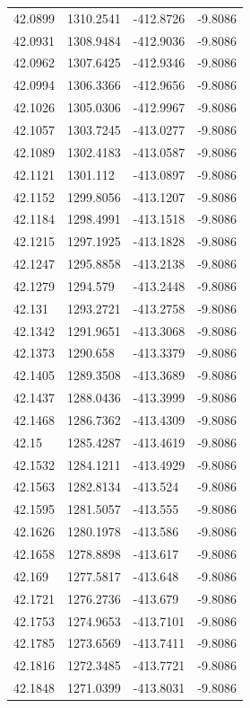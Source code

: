 \begin{table}[H]
\begin{tabular}{llll}
42.0899 & 1310.2541 & -412.8726 & -9.8086 \\
42.0931 & 1308.9484 & -412.9036 & -9.8086 \\
42.0962 & 1307.6425 & -412.9346 & -9.8086 \\
42.0994 & 1306.3366 & -412.9656 & -9.8086 \\
42.1026 & 1305.0306 & -412.9967 & -9.8086 \\
42.1057 & 1303.7245 & -413.0277 & -9.8086 \\
42.1089 & 1302.4183 & -413.0587 & -9.8086 \\
42.1121 & 1301.112 & -413.0897 & -9.8086 \\
42.1152 & 1299.8056 & -413.1207 & -9.8086 \\
42.1184 & 1298.4991 & -413.1518 & -9.8086 \\
42.1215 & 1297.1925 & -413.1828 & -9.8086 \\
42.1247 & 1295.8858 & -413.2138 & -9.8086 \\
42.1279 & 1294.579 & -413.2448 & -9.8086 \\
42.131 & 1293.2721 & -413.2758 & -9.8086 \\
42.1342 & 1291.9651 & -413.3068 & -9.8086 \\
42.1373 & 1290.658 & -413.3379 & -9.8086 \\
42.1405 & 1289.3508 & -413.3689 & -9.8086 \\
42.1437 & 1288.0436 & -413.3999 & -9.8086 \\
42.1468 & 1286.7362 & -413.4309 & -9.8086 \\
42.15 & 1285.4287 & -413.4619 & -9.8086 \\
42.1532 & 1284.1211 & -413.4929 & -9.8086 \\
42.1563 & 1282.8134 & -413.524 & -9.8086 \\
42.1595 & 1281.5057 & -413.555 & -9.8086 \\
42.1626 & 1280.1978 & -413.586 & -9.8086 \\
42.1658 & 1278.8898 & -413.617 & -9.8086 \\
42.169 & 1277.5817 & -413.648 & -9.8086 \\
42.1721 & 1276.2736 & -413.679 & -9.8086 \\
42.1753 & 1274.9653 & -413.7101 & -9.8086 \\
42.1785 & 1273.6569 & -413.7411 & -9.8086 \\
42.1816 & 1272.3485 & -413.7721 & -9.8086 \\
42.1848 & 1271.0399 & -413.8031 & -9.8086 \\

\end{tabular}
\end{table}
